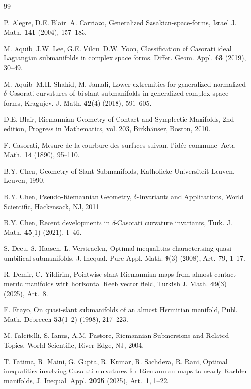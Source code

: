 \documentclass[11pt]{amsart}
\theoremstyle{plain}
\theoremstyle{definition}
\theoremstyle{remark}
\begin{document}
\begin{thebibliography}{99}

P. Alegre, D.E. Blair, A. Carriazo, Generalized Sasakian-space-forms,
Israel J. Math. \textbf{141} (2004), 157--183.

M. Aquib, J.W. Lee, G.E. Vilcu, D.W. Yoon, Classification of Casorati ideal
Lagrangian submanifolds in complex space forms,
Differ. Geom. Appl. \textbf{63} (2019), 30--49.

M. Aquib, M.H. Shahid, M. Jamali, Lower extremities for generalized normalized
$\delta$-Casorati curvatures of bi-slant submanifolds in generalized complex
space forms, Kragujev. J. Math. \textbf{42}(4) (2018), 591--605.

D.E. Blair, Riemannian Geometry of Contact and Symplectic Manifolds,
2nd edition, Progress in Mathematics, vol. 203, Birkh\"auser, Boston, 2010.

F. Casorati, Mesure de la courbure des surfaces suivant l'id\'ee commune,
Acta Math. \textbf{14} (1890), 95--110.

B.Y. Chen, Geometry of Slant Submanifolds,
Katholieke Universiteit Leuven, Leuven, 1990.

B.Y. Chen, Pseudo-Riemannian Geometry, $\delta$-Invariants and Applications,
World Scientific, Hackensack, NJ, 2011.

B.Y. Chen, Recent developments in $\delta$-Casorati curvature invariants,
Turk. J. Math. \textbf{45}(1) (2021), 1--46.

S. Decu, S. Haesen, L. Verstraelen, Optimal inequalities characterising
quasi-umbilical submanifolds,
J. Inequal. Pure Appl. Math. \textbf{9}(3) (2008), Art.~79, 1--17.

R. Demir, C. Yildirim, Pointwise slant Riemannian maps from almost contact
metric manifolds with horizontal Reeb vector field,
Turkish J. Math. \textbf{49}(3) (2025), Art.~8.

F. Etayo, On quasi-slant submanifolds of an almost Hermitian manifold,
Publ. Math. Debrecen \textbf{53}(1--2) (1998), 217--223.

M. Falcitelli, S. Ianus, A.M. Pastore, Riemannian Submersions and Related
Topics, World Scientific, River Edge, NJ, 2004.

T. Fatima, R. Maini, G. Gupta, R. Kumar, R. Sachdeva, R. Rani, Optimal
inequalities involving Casorati curvatures for Riemannian maps to nearly
Kaehler manifolds, J. Inequal. Appl. \textbf{2025} (2025), Art.~1, 1--22.


\end{thebibliography}
\end{document}
